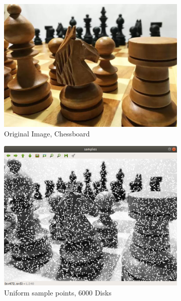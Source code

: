 \documentclass[11pt]{article}
\begin{document}
\begin{figure}[H]
	\centering
	\begin{subfigure}[b]{.52\linewidth}
		\includegraphics[width=\linewidth]{Chessboard}
		\caption{Original Image, Chessboard}
		\label{fig:gfff}
	\end{subfigure}
	\begin{subfigure}[b]{.48\linewidth}
		\includegraphics[width=\linewidth]{Chessboard-Points-1}
		\caption{Uniform sample points, 6000 Disks}
		\label{fig:rfff2}
	\end{subfigure}
	\begin{subfigure}[b]{.48\linewidth}

\end{subfigure}
\end{figure}
\end{document}
